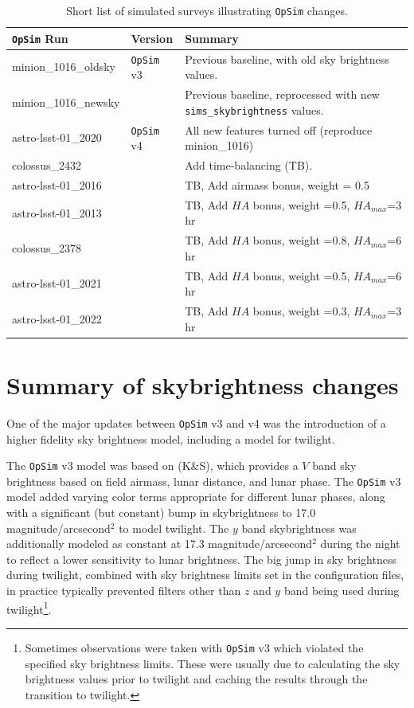 \documentclass[DM,authoryear,toc]{lsstdoc}
\newcommand{\opsim}{\texttt{OpSim}\xspace}
\newcommand{\simsky}{\texttt{sims\_skybrightness}\xspace}
\newcommand{\magasq}{magnitude/arcsecond$^{2}$\xspace}
\begin{document}
\begin{table}[htp]
\caption{Short list of simulated surveys illustrating \opsim changes.}
\begin{center}
\begin{tabular}{ l | l | l }
\toprule
\opsim Run & Version & Summary \\
\midrule
minion\_1016\_oldsky & \opsim v3 & Previous baseline, with old sky brightness values. \\
minion\_1016\_newsky &  & Previous baseline, reprocessed with new \simsky values.\\
astro-lsst-01\_2020 & \opsim v4  & All new features turned off (reproduce minion\_1016) \\
colossus\_2432 &  & Add time-balancing (TB).\\
astro-lsst-01\_2016 &  & TB, Add airmass bonus, weight = 0.5 \\
astro-lsst-01\_2013 &  & TB, Add $HA$ bonus, weight =0.5, $HA_{max}$=3 hr\\
colossus\_2378 &  &  TB, Add $HA$ bonus, weight =0.8, $HA_{max}$=6 hr\\
astro-lsst-01\_2021 & & TB, Add $HA$ bonus, weight =0.5, $HA_{max}$=6  hr\\
astro-lsst-01\_2022 &   & TB, Add $HA$ bonus, weight =0.3, $HA_{max}$=3 hr\\
\bottomrule
\end{tabular}
\end{center}
\label{tab:runlist}
\end{table}

\section{Summary of skybrightness changes}

One of the major updates between \opsim v3 and v4 was the introduction of a higher fidelity sky brightness model, including a model for twilight.

The \opsim v3 model was based on \citet{1991PASP..103.1033K} (K\&S), which provides a $V$ band sky brightness based on field airmass, lunar distance, and lunar phase. The \opsim v3 model added varying color terms appropriate for different lunar phases, along with a significant (but constant) bump in skybrightness to 17.0 \magasq to model twilight. The $y$ band skybrightness was additionally modeled as constant at 17.3 \magasq during the night to reflect a lower sensitivity to lunar brightness.  The big jump in sky brightness during twilight, combined with sky brightness limits set in the configuration files, in practice typically prevented filters other than $z$ and $y$ band being used during twilight\footnote{Sometimes observations were taken with \opsim v3 which violated the specified sky brightness limits. These were usually due to calculating the sky brightness values prior to twilight and caching the results through the transition to twilight.}.
\end{document}
